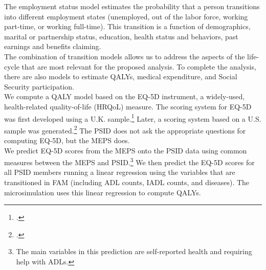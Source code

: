 \noindent The employment status model estimates the probability that a person transitions into different employment states (unemployed, out of the labor force, working part-time, or working full-time). This transition is a function of demographics, marital or partnership status, education, health status and behaviors, past earnings and benefits claiming. \\



\noindent The combination of transition models allows us to address the aspects of the life-cycle that are most relevant for the proposed analysis. To complete the analysis, there are also models to estimate QALYs, medical expenditure, and Social Security participation. \\

\noindent We compute a QALY model based on the EQ-5D instrument, a widely-used, health-related
quality-of-life (HRQoL) measure. %
The scoring system for EQ-5D was first developed using a U.K. sample.\footnote{\citet{Dolan_1997_Modeling_MC}.} Later, a scoring system based on
a U.S. sample was generated.\footnote{\citet{Shaw_etal_2005_EQ5D_MC}.} The PSID does not ask the appropriate questions for computing EQ-5D, but the MEPS does. \\

\noindent We predict EQ-5D scores from the MEPS onto the PSID data using common measures between the MEPS and PSID.\footnote{The main variables in this prediction are self-reported health and requiring help with ADLs.} We then predict the EQ-5D scores for all PSID members running a linear regression using the variables that are transitioned in FAM (including ADL counts, IADL counts, and diseases). The microsimulation uses this linear regression to compute QALYs. \\
%


